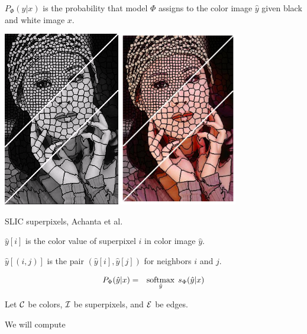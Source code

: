 {\vfill
$P_\Phi(\hat{y}|x)$ is the probability that model $\Phi$ assigns to the color image $\hat{y}$ given black and white image $x$.

\centerline{\includegraphics[height = 3in]{../images/SLIC} \hspace{.5in} \includegraphics[height = 3in]{../images/SLICcolor}}
\centerline{\huge SLIC superpixels, Achanta et al.}

\vfill
$\hat{y}[i]$ is the color value of superpixel $i$ in color image $\hat{y}$.

\vfill
$\hat{y}[(i,j)]$ is the pair $(\hat{y}[i],\hat{y}[j])$ for neighbors $i$ and $j$.


\begin{eqnarray*}
P_\Phi(\hat{y}|x) & = & \operatorname*{softmax}_{\hat{y}}\;s_\Phi(\hat{y}|x)
\end{eqnarray*}

\vfill
Let ${\cal C}$ be colors, ${\cal I}$ be superpixels, and ${\cal E}$ be edges.

\vfill
We will compute

}
